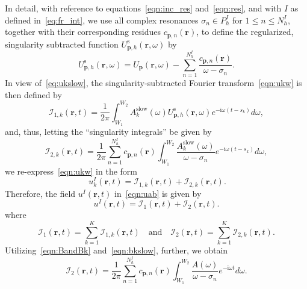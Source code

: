 \documentclass[11pt]{article}
\theoremstyle{plain}
\theoremstyle{remark}
\def \br{\mathbf{r}}
\def \bp{\mathbf{p}}
\begin{document}
In detail, with reference to equations~\eqref{eqn:inc_res} and~\eqref{eqn:res}, and with $I$ as defined in~\eqref{eq:fr_int}, we use all complex resonances
$\sigma_n \in P_h^{I}$ for $1 \le n \le N_h^{I}$, together with their
corresponding residues $c_{\bp,n}(\br)$, to define the regularized,
singularity subtracted function $U_{\bp,h}^\mathrm{s}(\br,\omega)$ by
\begin{equation}\label{eqn:ghs}
  U_{\bp,h}^\mathrm{s}(\br,\omega) = U_\bp(\br,\omega) - \sum_{n=1}^{N_h^{I}}\frac{c_{\bp,n}(\br)}{\omega - \sigma_n}.
\end{equation}
In view of~\eqref{eq:ukslow}, the singularity-subtracted Fourier
transform~\eqref{eqn:ukw} is then defined by
\begin{equation}\label{eqn:sing_sub_smooth}
    \mathcal{I}_{1,k}(\br,t) = \frac{1}{2\pi} \int_{W_1}^{W_2}  A_k^{\mathrm{slow}}(\omega)U_{\bp,h}^\mathrm{s}(\br,\omega)e^{-\mathrm{i}\omega (t - s_k)}d\omega,
\end{equation}
and, thus, letting the ``singularity integrals'' be given by
\begin{equation}\label{eqn:sing_sub_sing}
    \mathcal{I}_{2,k}(\br,t)  =  \frac{1}{2\pi} \sum_{n=1}^{N_h^{I}} c_{\bp,n}(\br) \int_{W_1}^{W_2}  \frac{A_k^{\mathrm{slow}}(\omega)}{\omega - \sigma_n}e^{-\mathrm{i}\omega (t - s_k)}d\omega,
\end{equation}
we re-express~\eqref{eqn:ukw} in the form
\begin{equation}~\label{eqn:sing_sub}
u^{I}_k(\br,t) =  \mathcal{I}_{1,k}(\br,t)  + \mathcal{I}_{2,k}(\br,t).
\end{equation}
Therefore, the field $u^{I}(\br,t)$ in~\eqref{eqn:uab} is given by
\begin{equation}\label{eqn:sing_sub_nok}
u^{I}(\br,t) =  \mathcal{I}_{1}(\br,t)  + \mathcal{I}_{2}(\br,t).
\end{equation}
where
\begin{equation}\label{eqn:I1I2tok}
  \mathcal{I}_{1}(\br,t) = \sum_{k=1}^K \mathcal{I}_{1,k}(\br,t) \quad \text{and} \quad \mathcal{I}_{2}(\br,t) = \sum_{k=1}^K \mathcal{I}_{2,k}(\br,t).
\end{equation}
Utilizing~\eqref{eqn:BandBk} and~\eqref{eqn:bkslow}, further, we obtain
\begin{equation}\label{eqn:I2}
  \mathcal{I}_{2}(\br,t) = \frac{1}{2\pi} \sum_{n=1}^{N_h^{I}} c_{\bp,n}(\br) \int_{W_1}^{W_2}  \frac{A(\omega)}{\omega - \sigma_n}e^{-\mathrm{i}\omega t}d\omega.
\end{equation}
\end{document}
